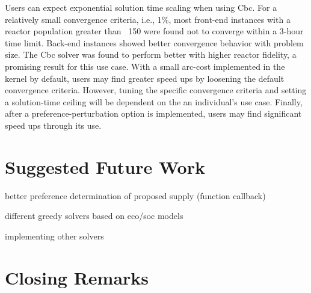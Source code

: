 Users can expect exponential solution time scaling when using Cbc. For a
relatively small convergence criteria, i.e., 1\%, most front-end instances with
a reactor population greater than ~150 were found not to converge within a
3-hour time limit. Back-end instances showed better convergence behavior with
problem size. The Cbc solver was found to perform better with higher reactor
fidelity, a promising result for this use case. With a small arc-cost
implemented in the kernel by default, users may find greater speed ups by
loosening the default convergence criteria. However, tuning the specific
convergence criteria and setting a solution-time ceiling will be dependent on
the an individual's use case. Finally, after a preference-perturbation option is
implemented, users may find significant speed ups through its use.

\section{Suggested Future Work}

better preference determination of proposed supply (function callback)

different greedy solvers based on eco/soc models

implementing other solvers

\section{Closing Remarks}
